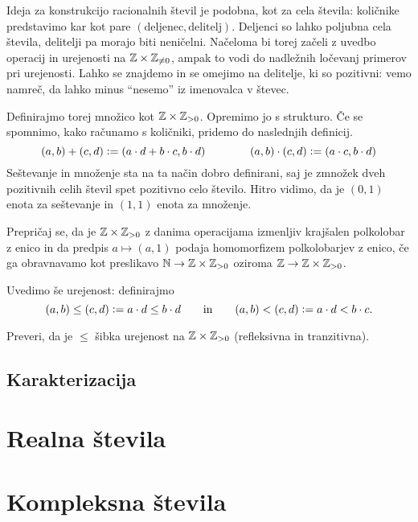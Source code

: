 Ideja za konstrukcijo racionalnih števil je podobna, kot za cela števila: količnike predstavimo kar kot pare $(\text{deljenec}, \text{delitelj})$. Deljenci so lahko poljubna cela števila, delitelji pa morajo biti neničelni. Načeloma bi torej začeli z uvedbo operacij in urejenosti na $\mathbb{Z} \times \mathbb{Z}_{\neq 0}$, ampak to vodi do nadležnih ločevanj primerov pri urejenosti. Lahko se znajdemo in se omejimo na delitelje, ki so pozitivni: vemo namreč, da lahko minus ``nesemo'' iz imenovalca v števec.

Definirajmo torej množico  kot $\mathbb{Z} \times \mathbb{Z}_{> 0}$. Opremimo jo s strukturo. Če se spomnimo, kako računamo s količniki, pridemo do naslednjih definicij.
\[(a, b) + (c, d) \mathrel{\mathop:}= (a \cdot d + b \cdot c, b \cdot d) \qquad\qquad (a, b) \cdot (c, d) \mathrel{\mathop:}= (a \cdot c, b \cdot d)\]
Seštevanje in množenje sta na ta način dobro definirani, saj je zmnožek dveh pozitivnih celih števil spet pozitivno celo število.  Hitro vidimo, da je $(0, 1)$ enota za seštevanje in $(1, 1)$ enota za množenje.

\begin{naloga}
Prepričaj se, da je $\mathbb{Z} \times \mathbb{Z}_{> 0}$ z danima operacijama izmenljiv krajšalen polkolobar z enico in da predpis $a \mapsto (a, 1)$ podaja homomorfizem polkolobarjev z enico, če ga obravnavamo kot preslikavo $\mathbb{N} \to \mathbb{Z} \times \mathbb{Z}_{> 0}$ oziroma $\mathbb{Z} \to \mathbb{Z} \times \mathbb{Z}_{> 0}$.
\end{naloga}

Uvedimo še urejenost: definirajmo
\[(a, b) \leq (c, d) \mathrel{\mathop:}= a \cdot d \leq b \cdot d \qquad \text{in} \qquad (a, b) < (c, d) \mathrel{\mathop:}= a \cdot d < b \cdot c.\]

\begin{naloga}
Preveri, da je $\leq$ šibka urejenost na $\mathbb{Z} \times \mathbb{Z}_{> 0}$ (refleksivna in tranzitivna).
\end{naloga}

\subsection{Karakterizacija}

\section{Realna števila}
\label{sec:realna-stevila}


\section{Kompleksna števila}

